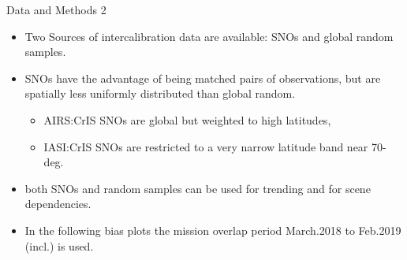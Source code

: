 \documentclass[10pt,t]{beamer}
\begin{document}
\begin{frame}{Data and Methods 2}

  \begin{itemize}
  \item Two Sources of intercalibration data are available: SNOs and global random samples.
  \item SNOs have the advantage of being matched pairs of observations, but are spatially less uniformly distributed than global random.
    \begin{itemize}
    \item AIRS:CrIS SNOs are global but weighted to high latitudes,
    \item IASI:CrIS SNOs are restricted to a very narrow latitude band near 70-deg.
    \end{itemize}
  \item both SNOs and random samples can be used for trending and for scene dependencies.
  \item In the following bias plots the mission overlap period March.2018 to Feb.2019 (incl.) is used.
    
  \end{itemize}

\end{frame}
\end{document}
